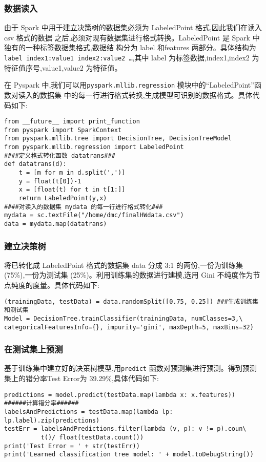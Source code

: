 \subsubsection{数据读入}\label{ux6570ux636eux8bfbux5165}

由于 Spark 中用于建立决策树的数据集必须为 LabeledPoint
格式,因此我们在读入 csv 格式的数据
之后,必须对现有数据集进行格式转换。LabeledPoint 是 Spark
中独有的一种标签数据集格式,数据结 构分为 label 和features
两部分。具体结构为\texttt{label index1:value1 index2:value2 \ldots{}},其中 label
为标签数据,index1,index2 为特征值序号,value1,value2 为特征值。

在 Pyspark 中,我们可以用\texttt{pyspark.mllib.regression}
模块中的“LabeledPoint”函数对读入的数据集
中的每一行进行格式转换,生成模型可识别的数据格式。具体代码如下:

\begin{lstlisting}
from __future__ import print_function
from pyspark import SparkContext
from pyspark.mllib.tree import DecisionTree, DecisionTreeModel
from pyspark.mllib.regression import LabeledPoint
####定义格式转化函数 datatrans###
def datatrans(d):
    t = [m for m in d.split(',')]
    y = float(t[0])-1
    x = [float(t) for t in t[1:]]
    return LabeledPoint(y,x)
####对读入的数据集 mydata 的每一行进行格式转化###
mydata = sc.textFile("/home/dmc/finalHWdata.csv")
data = mydata.map(datatrans)
\end{lstlisting}

\subsubsection{建立决策树}\label{ux5efaux7acbux51b3ux7b56ux6811}

将已转化成 LabeledPoint 格式的数据集 data 分成 3:1
的两份,一份为训练集(75\%),一份为测试集
(25\%)。利用训练集的数据进行建模,选用 Gini
不纯度作为节点纯度的度量。具体代码如下:

\begin{lstlisting}
(trainingData, testData) = data.randomSplit([0.75, 0.25]) ###生成训练集和测试集
Model = DecisionTree.trainClassifier(trainingData, numClasses=3,\
categoricalFeaturesInfo={}, impurity='gini', maxDepth=5, maxBins=32)
\end{lstlisting}

\subsubsection{在测试集上预测}\label{ux5728ux6d4bux8bd5ux96c6ux4e0aux9884ux6d4b}

基于训练集中建立好的决策树模型,用\texttt{predict}
函数对预测集进行预测。得到预测集上的错分率Test Error为
39.29\%,具体代码如下:

\begin{lstlisting}
predictions = model.predict(testData.map(lambda x: x.features))
######计算错分率######
labelsAndPredictions = testData.map(lambda lp: lp.label).zip(predictions)
testErr = labelsAndPredictions.filter(lambda (v, p): v != p).coun\
          t()/ float(testData.count())
print('Test Error = ' + str(testErr))
print('Learned classification tree model: ' + model.toDebugString())
\end{lstlisting}

